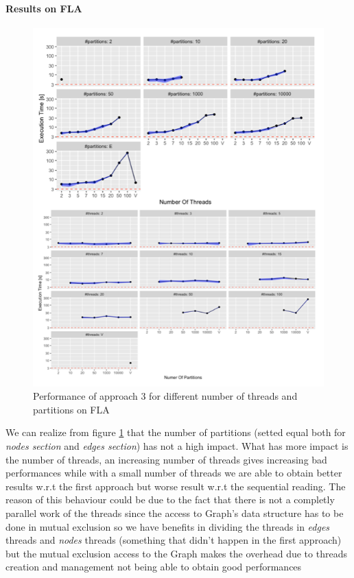 \documentclass[twocolumn, switch]{article} %
\begin{document}
\paragraph{Results on FLA}
\begin{figure}[ht!]
  \centering
  \includegraphics[width=1\linewidth]{par_read_3_time.png}
  \caption{Performance of approach 3 for different number of threads and partitions on FLA}
  \label{parread3time}
\end{figure}
We can realize from figure \ref{parread3time} that the number of partitions (setted equal
both for \textit{nodes section} and \textit{edges section}) has not a high impact.
What has more impact is the number of threads, an increasing number of threads gives increasing
bad performances while with a small number of threads we are able to obtain better results
w.r.t the first approach but worse result w.r.t the sequential reading. The reason of this
behaviour could be due to the fact that there is not a completly parallel work of the threads
since the access to Graph's data structure has to be done in mutual exclusion so we 
have benefits in dividing the threads in \textit{edges} threads and \textit{nodes} threads (something
that didn't happen in the first approach) but the mutual exclusion access to the Graph
makes the overhead due to threads creation and management not being able to obtain good
performances
\end{document}
